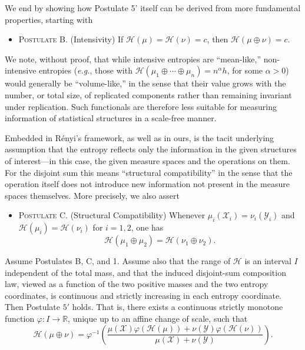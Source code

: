 \documentclass[reqno]{amsart}
\begin{document}
We end by showing how Postulate 5' itself can be derived from more fundamental properties, starting with   
\begin{itemize}
    \item[] \textsc{Postulate B.} (Intensivity) \quad If  $\mathcal{H}(\mu) = \mathcal{H}(\nu) = c$, then
    $\mathcal{H}(\mu\oplus \nu) = c$.
\end{itemize}

\begin{remark}
    We note, without proof, that while intensive entropies are ``mean-like,'' non-intensive entropies (\textit{e.g.}, those with  $\mathcal{H}(\mu_1\oplus \cdots \oplus \mu_n) = n^\alpha h$, for some $\alpha>0$)  would generally be ``volume-like,'' in the sense that their value grows with the number, or total size, of replicated components rather than remaining invariant under replication. Such functionals are therefore less suitable for measuring information of statistical structures in a scale-free manner.
\end{remark}


Embedded in R\'enyi's framework, as well as in ours, is the tacit underlying assumption that the entropy reflects only the information in the given structures of interest---in this case, the given measure spaces and the operations on them.
For the disjoint sum this means ``structural compatibility'' in the sense that the operation itself does not introduce new information not present in the measure spaces themselves. More precisely, we also assert
\begin{itemize}
    \item[] \textsc{Postulate C.} (Structural Compatibility) \quad 
Whenever
$\mu_i(\mathcal{X}_i)=\nu_i(\mathcal{Y}_i)$ and $\mathcal H(\mu_i)=\mathcal H(\nu_i)
$
for $i=1,2$, one has
$$
\mathcal H(\mu_1\oplus\mu_2)
=
\mathcal H(\nu_1\oplus\nu_2).
$$
\end{itemize}




\begin{prop}
\label{prop:derive-5'}
Assume Postulates B, C, and 1. 
Assume also that the range of $\mathcal H$ is an interval $I$ independent of the total mass, and that the induced disjoint-sum composition law, viewed as a function of the two positive masses and the two entropy coordinates, is continuous and strictly increasing in each entropy coordinate. 
Then Postulate $5'$ holds.
That is, there exists a continuous strictly monotone function
$\varphi:I\to\mathbb R$, unique up to an affine change of scale, such that
$$
\mathcal H(\mu\oplus\nu)
=
\varphi^{-1}
\left(
\frac{
\mu(\mathcal X)\varphi(\mathcal H(\mu))
+
\nu(\mathcal Y)\varphi(\mathcal H(\nu))
}{
\mu(\mathcal X)+\nu(\mathcal Y)
}
\right).
$$
\end{prop}
\end{document}
